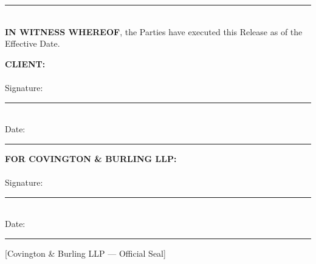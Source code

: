\documentclass[11pt,letterpaper]{article}
\begin{document}
\vfill
\begin{center}
  \textcolor{MutedGold}{\rule{0.4\textwidth}{0.5pt}} \\[4pt]
  \textcolor{DarkNavy}{\textbf{IN WITNESS WHEREOF}}, the Parties have executed
  this Release as of the Effective Date.
\end{center}

\vspace{0.5cm}
\begin{minipage}[t]{0.45\textwidth}
  \textcolor{DarkNavy}{\textbf{CLIENT:}} \\[0.2cm]
  \textcolor{DarkNavy}{\textbf{\ClientName}} \\[0.3cm]
  \textcolor{DarkNavy!60!black}{\small Signature:} \rule{5cm}{0.4pt} \\[0.2cm]
  \textcolor{DarkNavy!60!black}{\small Date:} \rule{4cm}{0.4pt}
\end{minipage}
\hfill
\begin{minipage}[t]{0.45\textwidth}
  \textcolor{DarkNavy}{\textbf{FOR COVINGTON \& BURLING LLP:}} \\[0.2cm]
  \\[0.3cm]
  \textcolor{DarkNavy!60!black}{\small Signature:} \rule{5cm}{0.4pt} \\[0.2cm]
  \textcolor{DarkNavy!60!black}{\small Date:} \rule{4cm}{0.4pt}
\end{minipage}

\vspace{0.3cm}
\begin{center}
  \textcolor{DarkNavy!30!white}{\small [Covington \& Burling LLP — Official Seal]}
\end{center}
\end{document}
